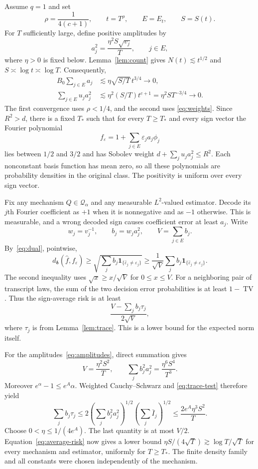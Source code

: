 \documentclass[11pt]{article}
\newcommand{\TV}{\operatorname{TV}}
\newcommand{\ind}{\mathbf 1}
\begin{document}
Assume $q=1$ and set
\[
 \rho=\frac1{4(c+1)},\qquad t=T^\rho,\qquad E=E_t,\qquad S=S(t).
\]
For $T$ sufficiently large, define positive amplitudes by
\begin{equation}\label{eq:amplitudes}
 a_j^2=\frac{\eta^2 S\sqrt{v_j}}{T},\qquad j\in E,
\end{equation}
where $\eta>0$ is fixed below. Lemma~\ref{lem:count} gives
$N(t)\lesssim t^{1/2}$ and $S\asymp\log t\asymp\log T$.
Consequently,
\begin{align}
 B_0\sum_{j\in E}a_j&\lesssim
 \eta\sqrt{S/T}\,t^{3/4}\longrightarrow0,\label{eq:positive}\\
 \sum_{j\in E}u_ja_j^2&\lesssim
 \eta^2(S/T)t^{c+1}
 =\eta^2 S T^{-3/4}\longrightarrow0.\label{eq:smooth}
\end{align}
The first convergence uses $\rho<1/4$, and the second uses
\eqref{eq:weights}. Since $R^2>d$, there is a fixed $T_*$ such that for
every $T\ge T_*$ and every sign vector the Fourier polynomial
\[
 f_\varepsilon=1+\sum_{j\in E}\varepsilon_ja_j\phi_j
\]
lies between $1/2$ and $3/2$ and has Sobolev weight
$d+\sum_j u_ja_j^2\le R^2$. Each nonconstant basis function has mean zero,
so all these polynomials are probability densities in the original class.
The positivity is uniform over every sign vector.

Fix any mechanism $Q\in\mathcal Q_\alpha$ and any measurable $L^2$-valued
estimator. Decode its $j$th Fourier coefficient as $+1$ when it is
nonnegative and as $-1$ otherwise. This is measurable, and a wrong decoded
sign causes coefficient error at least $a_j$. Write
\[
 w_j=v_j^{-1},\qquad b_j=w_ja_j^2,\qquad V=\sum_{j\in E}b_j.
\]
By~\eqref{eq:dual}, pointwise,
\begin{equation}\label{eq:norm-hamming}
 d_{\boldsymbol\delta}(\widehat f,f_\varepsilon)
 \ge\sqrt{\sum_j b_j\ind_{\{\widehat\varepsilon_j\ne\varepsilon_j\}}}
 \ge\frac1{\sqrt V}\sum_jb_j\ind_{\{\widehat\varepsilon_j\ne\varepsilon_j\}}.
\end{equation}
The second inequality uses $\sqrt x\ge x/\sqrt V$ for $0\le x\le V$.
For a neighboring pair of transcript laws, the sum of the two decision
error probabilities is at least $1-\TV$.
Thus the sign-average risk is at least
\begin{equation}\label{eq:average-risk}
 \frac{V-\sum_j b_j\tau_j}{2\sqrt V},
\end{equation}
where $\tau_j$ is from Lemma~\ref{lem:trace}. This is a lower bound for the
expected norm itself.

For the amplitudes~\eqref{eq:amplitudes}, direct summation gives
\[
 V=\frac{\eta^2 S^2}{T},\qquad
 \sum_j b_j^2a_j^2=\frac{\eta^6 S^4}{T^3}.
\]
Moreover $e^\alpha-1\le e^A\alpha$. Weighted Cauchy--Schwarz and
\eqref{eq:trace-test} therefore yield
\[
 \sum_j b_j\tau_j
 \le2\left(\sum_j b_j^2a_j^2\right)^{1/2}
       \left(\sum_j\bar I_j\right)^{1/2}
 \le\frac{2e^A\eta^3 S^2}{T}.
\]
Choose $0<\eta\le1/(4e^A)$. The last quantity is at most $V/2$.
Equation~\eqref{eq:average-risk} now gives a lower bound
$\eta S/(4\sqrt T)\gtrsim\log T/\sqrt T$ for every mechanism and estimator,
uniformly for $T\ge T_*$. The finite density family and all constants were
chosen independently of the mechanism.
\end{document}
